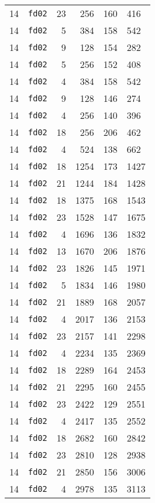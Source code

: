 \documentclass{article}
\begin{document}
\begin{table}[h!]
\begin{tabular}{llrrrl}
    14 & \texttt{fd02} & 23 & 256 & 160 & 416 \\
    14 & \texttt{fd02} & 5 & 384 & 158 & 542 \\
    14 & \texttt{fd02} & 9 & 128 & 154 & 282 \\
    14 & \texttt{fd02} & 5 & 256 & 152 & 408 \\
    14 & \texttt{fd02} & 4 & 384 & 158 & 542 \\
    14 & \texttt{fd02} & 9 & 128 & 146 & 274 \\
    14 & \texttt{fd02} & 4 & 256 & 140 & 396 \\
    14 & \texttt{fd02} & 18 & 256 & 206 & 462 \\
    14 & \texttt{fd02} & 4 & 524 & 138 & 662 \\
    14 & \texttt{fd02} & 18 & 1254 & 173 & 1427 \\
    14 & \texttt{fd02} & 21 & 1244 & 184 & 1428 \\
    14 & \texttt{fd02} & 18 & 1375 & 168 & 1543 \\
    14 & \texttt{fd02} & 23 & 1528 & 147 & 1675 \\
    14 & \texttt{fd02} & 4 & 1696 & 136 & 1832 \\
    14 & \texttt{fd02} & 13 & 1670 & 206 & 1876 \\
    14 & \texttt{fd02} & 23 & 1826 & 145 & 1971 \\
    14 & \texttt{fd02} & 5 & 1834 & 146 & 1980 \\
    14 & \texttt{fd02} & 21 & 1889 & 168 & 2057 \\
    14 & \texttt{fd02} & 4 & 2017 & 136 & 2153 \\
    14 & \texttt{fd02} & 23 & 2157 & 141 & 2298 \\
    14 & \texttt{fd02} & 4 & 2234 & 135 & 2369 \\
    14 & \texttt{fd02} & 18 & 2289 & 164 & 2453 \\
    14 & \texttt{fd02} & 21 & 2295 & 160 & 2455 \\
    14 & \texttt{fd02} & 23 & 2422 & 129 & 2551 \\
    14 & \texttt{fd02} & 4 & 2417 & 135 & 2552 \\
    14 & \texttt{fd02} & 18 & 2682 & 160 & 2842 \\
    14 & \texttt{fd02} & 23 & 2810 & 128 & 2938 \\
    14 & \texttt{fd02} & 21 & 2850 & 156 & 3006 \\
    14 & \texttt{fd02} & 4 & 2978 & 135 & 3113 \\

\end{tabular}
\end{table}
\end{document}
